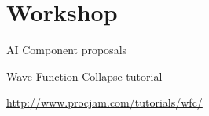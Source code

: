 \part{Workshop}
\frame{\partpage}

\begin{frame}{AI Component proposals}
\end{frame}

\begin{frame}{Wave Function Collapse tutorial}
    \begin{center}
        \url{http://www.procjam.com/tutorials/wfc/}
    \end{center}
\end{frame}
